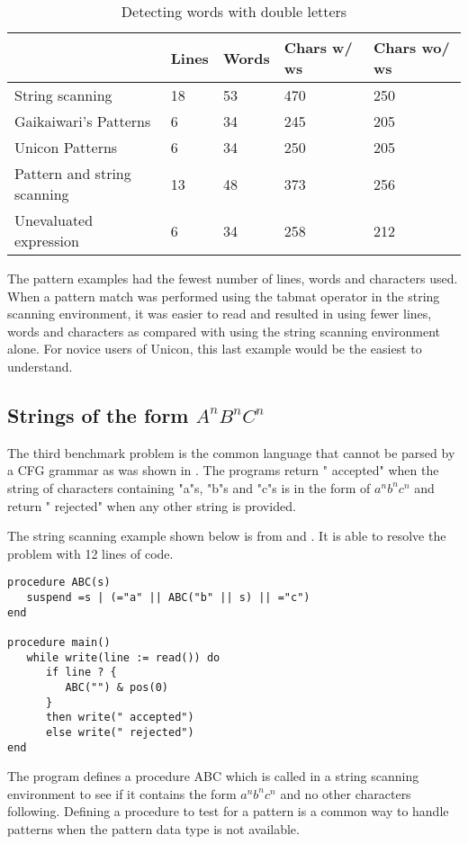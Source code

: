 \documentclass{article}
\begin{document}
\begin{table}[ht]
	\caption{Detecting words with double letters}
	\centering
	\begin{tabular}{|l|l|l|l|l|}
		\hline\hline
		 & Lines & Words & Chars w/ ws & Chars wo/ ws\\
		\hline
		String scanning & 18 & 53 & 470 & 250 \\
		Gaikaiwari's Patterns & 6 & 34 & 245 & 205 \\
		Unicon Patterns & 6 & 34 & 250 & 205 \\
		Pattern and string scanning & 13 & 48 & 373 & 256 \\
		Unevaluated expression & 6 & 34 & 258 & 212 \\
		\hline
	\end{tabular}
\end{table}
The pattern examples had the fewest number of lines, words and characters used.  When a pattern match was performed using the tabmat operator in the string scanning environment, it was easier to read and resulted in using fewer lines, words and characters as compared with using the string scanning environment alone.  For novice users of Unicon, this last example would be the easiest to understand.

\subsection{Strings of the form \emph{$A^nB^nC^n$}}
The third benchmark problem is the common language that cannot be parsed by a CFG grammar as was shown in \cite{Gaikaiwari2005}.  The programs return " accepted" when the string of characters containing "a"s, "b"s and "c"s is in the form of $a^nb^nc^n$ and return " rejected" when any other string is provided.

The string scanning example shown below is from \cite{Gaikaiwari2005} and \cite{Griswold1975}.  It is able to resolve the problem with 12 lines of code.
\begin{verbatim}
procedure ABC(s)
   suspend =s | (="a" || ABC("b" || s) || ="c")
end

procedure main()
   while write(line := read()) do
      if line ? {
         ABC("") & pos(0)
      } 
      then write(" accepted")
      else write(" rejected")
end
\end{verbatim}
The program defines a procedure ABC which is called in a string scanning environment to see if it contains the form $a^nb^nc^n$ and no other characters following.  Defining a procedure to test for a pattern is a common way to handle patterns when the pattern data type is not available.
\end{document}
